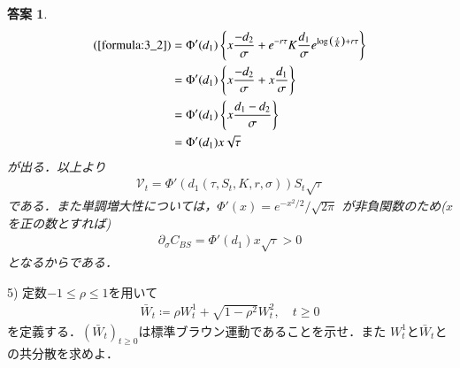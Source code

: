 \documentclass[11pt,a4paper]{jsarticle}
\theoremstyle{mystyle}
\newtheorem*{ans}{答案}
\begin{document}
\begin{ans}
\begin{align}
		(\refeq{formula:3_2}) &= 
		\Phi'(d_{1}) \left\{x\frac{-d_{2}}{\sigma} + e^{-r\tau}K\frac{d_{1}}{\sigma}e^{\log{\left(\frac{x}{K}\right)}+r\tau}\right\} \\
		&= \Phi'(d_{1}) \left\{x\frac{-d_{2}}{\sigma} + x\frac{d_{1}}{\sigma}\right\} \\
		&= \Phi'(d_{1}) \left\{x \frac{d_{1}-d_{2}}{\sigma}\right\} \\
		&= \Phi'(d_{1}) x \sqrt{\tau}
	\end{align}
	が出る．以上より
	\begin{align}
		\mathcal{V}_{t} = \Phi'(d_{1}(\tau,S_{t},K,r,\sigma)) S_{t} \sqrt{\tau}
	\end{align}
	である．また単調増大性については，$\Phi'(x) = e^{-x^{2}/2}/\sqrt{2\pi}$
	が非負関数のため($x$を正の数とすれば)
	\begin{align}
		\partial_{\sigma}C_{BS} = \Phi'(d_{1}) x \sqrt{\tau} > 0
	\end{align}
	となるからである．
\end{ans}

\begin{itembox}[l]{5)}
	定数$-1 \leq \rho \leq 1$を用いて
	\begin{align}
		\bar{W}_{t} \coloneqq \rho W^{1}_{t} + \sqrt{1-\rho^{2}} W^{2}_{t},
		\quad t \geq 0
	\end{align}
	を定義する．$(\bar{W}_{t})_{t \geq 0}$は標準ブラウン運動であることを示せ．また
	$W^{1}_{t}$と$\bar{W}_{t}$との共分散を求めよ．
\end{itembox}
\end{document}
